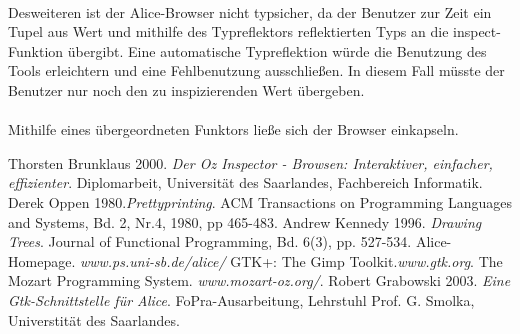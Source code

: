 \documentclass[12pt,a4paper]{article}
\begin{document}
\paragraph{}

Desweiteren ist der Alice-Browser nicht typsicher, 
da der Benutzer zur Zeit ein Tupel aus 
Wert und mithilfe des Typreflektors reflektierten Typs 
an die inspect-Funktion \"ubergibt.  
Eine automatische Typreflektion w\"urde die Benutzung des Tools 
erleichtern und eine Fehlbenutzung ausschlie\ss en. 
In diesem Fall m\"usste der Benutzer nur noch den zu 
inspizierenden Wert \"ubergeben. 

\paragraph{}

Mithilfe eines \"ubergeordneten Funktors lie\ss e 
sich der Browser einkapseln.



\begin{thebibliography}{99}

 Thorsten Brunklaus 2000. {\em Der Oz Inspector - Browsen: 
    Interaktiver, einfacher, effizienter}. Diplomarbeit, Universit\"at 
    des Saarlandes, Fachbereich Informatik.
 Derek Oppen 1980.{\em Prettyprinting}. ACM Transactions 
  on Programming Languages and Systems, Bd. 2, Nr.4, 1980, pp 465-483.
 Andrew Kennedy 1996. {\em Drawing Trees}. 
                Journal of Functional Programming, Bd. 6(3), pp. 527-534.
 Alice-Homepage. {\em www.ps.uni-sb.de/alice/}
 GTK+: The Gimp Toolkit.{\em www.gtk.org}. 
 The Mozart Programming System. {\em www.mozart-oz.org/}.
 Robert Grabowski 2003. {\em Eine Gtk-Schnittstelle f\"ur 
                Alice}. 
                FoPra-Ausarbeitung, Lehrstuhl Prof. G. Smolka, 
                Universtit\"at des Saarlandes.

\end{thebibliography}
\end{document}
